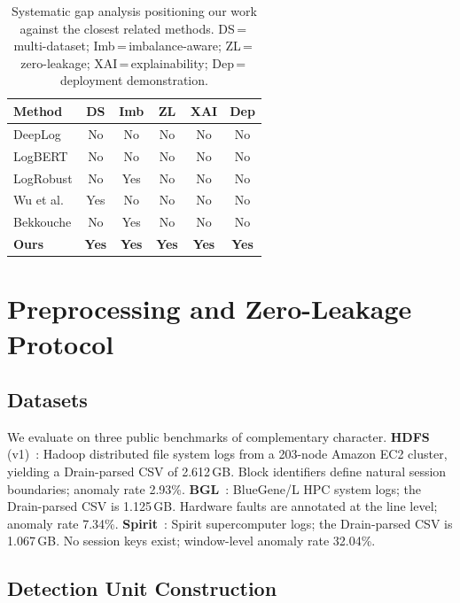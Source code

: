 \documentclass{elektr}
\begin{document}
\begin{table}[h!]
\caption{Systematic gap analysis positioning our work against the closest
related methods. DS\,=\,multi-dataset; Imb\,=\,imbalance-aware; ZL\,=\,zero-leakage;
XAI\,=\,explainability; Dep\,=\,deployment demonstration.}
\begin{center}
\small
\begin{tabular}{|p{2.3cm}|c|c|c|c|c|}
\hline
\textbf{Method} & \textbf{DS} & \textbf{Imb} & \textbf{ZL} & \textbf{XAI} & \textbf{Dep} \\
\hline
DeepLog \cite{ref5}      & No  & No  & No  & No  & No  \\
LogBERT \cite{ref18}     & No  & No  & No  & No  & No  \\
LogRobust \cite{ref17}   & No  & Yes & No  & No  & No  \\
Wu et al. \cite{ref8}    & Yes & No  & No  & No  & No  \\
Bekkouche \cite{ref2}    & No  & Yes & No  & No  & No  \\
\textbf{Ours}            & \textbf{Yes} & \textbf{Yes} & \textbf{Yes} & \textbf{Yes} & \textbf{Yes} \\
\hline
\end{tabular}
\label{tab:gap_analysis}
\end{center}\vs{-4mm}
\end{table}

\section{Preprocessing and Zero-Leakage Protocol}
\label{Sec:Preprocessing}

\subsection{Datasets}

We evaluate on three public benchmarks of complementary character.
\textbf{HDFS} (v1)~\cite{ref13}: Hadoop distributed file system logs from a 203-node Amazon
EC2 cluster, yielding a Drain-parsed CSV of 2.612\,GB.
Block identifiers define natural session boundaries; anomaly rate 2.93\%.
\textbf{BGL}~\cite{ref15}: BlueGene/L HPC system logs; the Drain-parsed CSV is
1.125\,GB. Hardware faults are annotated at the line level; anomaly rate 7.34\%.
\textbf{Spirit}~\cite{ref3,ref14}: Spirit supercomputer logs;
the Drain-parsed CSV is 1.067\,GB.
No session keys exist; window-level anomaly rate 32.04\%.

\subsection{Detection Unit Construction}
\end{document}
